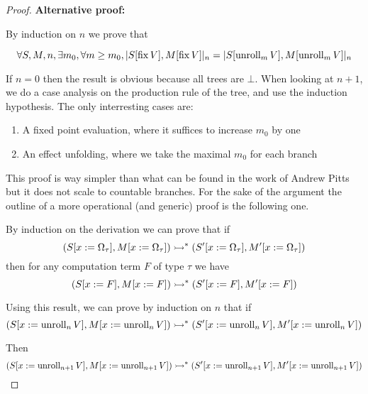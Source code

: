 \begin{ensps}
\begin{proof}
    \textbf{Alternative proof:}

    By induction on $n$ we prove that 

    \begin{equation*}
        \forall S,M,n,
        \exists m_0, \forall m \geq m_0, 
        |S[\operatorname{fix} V], M[\operatorname{fix} V]|_n = |S[\operatorname{unroll}_m V], M[\operatorname{unroll}_m V]|_n
    \end{equation*}


    If $n = 0$ then the result is obvious because all trees are $\bot$.
    When looking at $n+1$, we do a case analysis on the production rule 
    of the tree, and use the induction hypothesis. The only interresting 
    cases are: 

    \begin{enumerate}
        \item A fixed point evaluation, where it suffices to increase $m_0$ 
            by one
        \item An effect unfolding, where we take the maximal $m_0$ for each
            branch
    \end{enumerate}

    This proof is way simpler than what can be found in the work of Andrew Pitts
    but it does not scale to countable branches. For the sake of the argument 
    the outline of a more operational (and generic) proof is the following one.

    By induction on the derivation we can prove that 
    if 
    \begin{equation*}
        (S[x:=\Omega_\tau],M[x:=\Omega_\tau]) \rightarrowtail^* 
        (S'[x:=\Omega_\tau], M'[x:=\Omega_\tau])
    \end{equation*}
    then for any computation term $F$ of type $\tau$ 
    we have 
    \begin{equation*}
        (S[x:=F],M[x:=F]) \rightarrowtail^* 
        (S'[x:=F], M'[x:=F])
    \end{equation*}

    Using this result, we can prove by induction on $n$ 
    that if 
    \begin{equation*}
        (S[x:=\operatorname{unroll}_n V],M[x:=\operatorname{unroll}_n V]) \rightarrowtail^* 
        (S'[x:=\operatorname{unroll}_n V], M'[x:=\operatorname{unroll}_n V])
    \end{equation*}

    Then 
    \begin{equation*}
        (S[x:=\operatorname{unroll}_{n+1} V],M[x:=\operatorname{unroll}_{n+1} V]) \rightarrowtail^* 
        (S'[x:=\operatorname{unroll}_{n+1} V], M'[x:=\operatorname{unroll}_{n+1} V])
    \end{equation*}


\end{proof}
\end{ensps}
